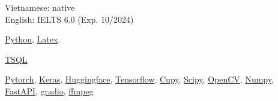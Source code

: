 \documentclass{src/preamble/doc_class}
\begin{document}
	\begin{SideBar}{\ColorBackground}{\ColorTextSide}


      	\begin{minipage}[t][1.25cm]{6cm}
        \vspace{-1.5mm}
        Vietnamese: native\\
        English: IELTS 6.0 (Exp. 10/2024)
        \end{minipage}

		\begin{minipage}[t][0.75cm]{6cm}
        \vspace{-1.5mm}
        \href{https://www.python.org/}{Python}, \href{https://www.tug.org/texlive/}{Latex}.
        \end{minipage}

        \begin{minipage}[t][0.75cm]{6cm}
        \vspace{-1.5mm}
         \href{https://www.microsoft.com/en-us/sql-server}{TSQL}
        \end{minipage}

        \begin{minipage}[t][1.65cm]{6cm}
        \vspace{-1.5mm}
        \href{https://pytorch.org/}{Pytorch}, \href{https://keras.io/}{Keras}, \href{https://huggingface.co/}{Huggingface}, \href{https://www.tensorflow.org/}{Tensorflow}, \href{https://cupy.dev/}{Cupy}, \href{https://scipy.org/}{Scipy}, \href{https://opencv.org/}{OpenCV},  \href{https://numpy.org/doc/stable/reference/generated/numpy.save.html}{Numpy}, \href{https://fastapi.tiangolo.com/about/}{FastAPI}, \href{https://www.gradio.app/}{gradio}, \href{https://ffmpeg.org/}{ffmpeg}
        \end{minipage}


\end{SideBar}
\end{document}
